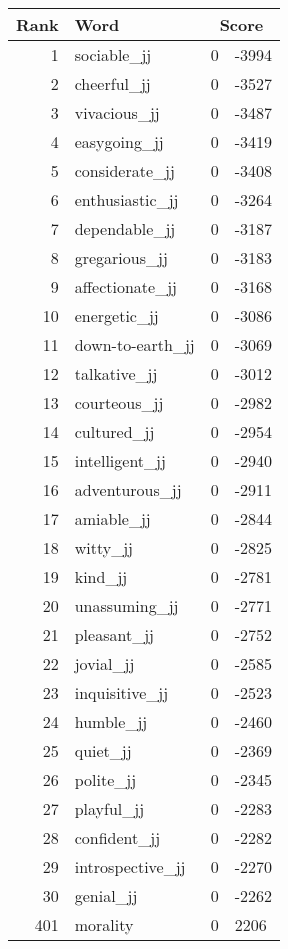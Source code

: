 \begin{longtable}[!htbp]{| rlr@{.}l |}
    \hline
    \textbf{Rank} & \textbf{Word} & \multicolumn{2}{c|}{\textbf{Score}} \\
    \hline
    \endhead
    1 & sociable\_jj & 0 & -3994 \\
    2 & cheerful\_jj & 0 & -3527 \\
    3 & vivacious\_jj & 0 & -3487 \\
    4 & easygoing\_jj & 0 & -3419 \\
    5 & considerate\_jj & 0 & -3408 \\
    6 & enthusiastic\_jj & 0 & -3264 \\
    7 & dependable\_jj & 0 & -3187 \\
    8 & gregarious\_jj & 0 & -3183 \\
    9 & affectionate\_jj & 0 & -3168 \\
    10 & energetic\_jj & 0 & -3086 \\
    11 & down-to-earth\_jj & 0 & -3069 \\
    12 & talkative\_jj & 0 & -3012 \\
    13 & courteous\_jj & 0 & -2982 \\
    14 & cultured\_jj & 0 & -2954 \\
    15 & intelligent\_jj & 0 & -2940 \\
    16 & adventurous\_jj & 0 & -2911 \\
    17 & amiable\_jj & 0 & -2844 \\
    18 & witty\_jj & 0 & -2825 \\
    19 & kind\_jj & 0 & -2781 \\
    20 & unassuming\_jj & 0 & -2771 \\
    21 & pleasant\_jj & 0 & -2752 \\
    22 & jovial\_jj & 0 & -2585 \\
    23 & inquisitive\_jj & 0 & -2523 \\
    24 & humble\_jj & 0 & -2460 \\
    25 & quiet\_jj & 0 & -2369 \\
    26 & polite\_jj & 0 & -2345 \\
    27 & playful\_jj & 0 & -2283 \\
    28 & confident\_jj & 0 & -2282 \\
    29 & introspective\_jj & 0 & -2270 \\
    30 & genial\_jj & 0 & -2262 \\
    401 & morality & 0 & 2206 \\

\end{longtable}
